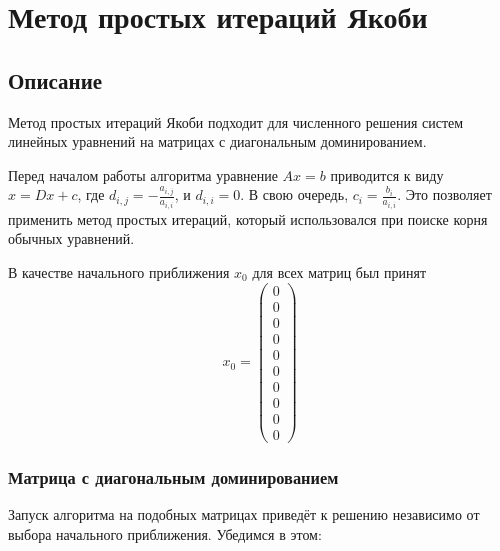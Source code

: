 \documentclass[../../report.tex]{subfiles}
\begin{document}
\chapter{Метод простых итераций Якоби}

\section{Описание}
Метод простых итераций Якоби подходит для численного решения 
систем линейных уравнений на матрицах с диагональным доминированием.

Перед началом работы алгоритма уравнение $Ax=b$ приводится к виду $x = Dx + c$,
где $d_{i,j} = - \frac{a_{i,j}}{a_{i,i}}$, и $d_{i,i} = 0$. 
В свою очередь, $c_i = \frac{b_i}{a_{i,i}}$. Это позволяет применить метод простых итераций,
который использовался при поиске корня обычных уравнений.

В качестве начального приближения $x_0$ для всех матриц был принят 
\[
x_0 = 
\begin{pmatrix} 
  0 \\ 
  0 \\ 
  0 \\ 
  0 \\ 
  0 \\ 
  0 \\ 
  0 \\ 
  0 \\ 
  0 \\ 
  0 
\end{pmatrix}
\]

\subsection{Матрица с диагональным доминированием}
Запуск алгоритма на подобных матрицах приведёт к 
решению независимо от выбора начального приближения. Убедимся в этом:\\
\end{document}

